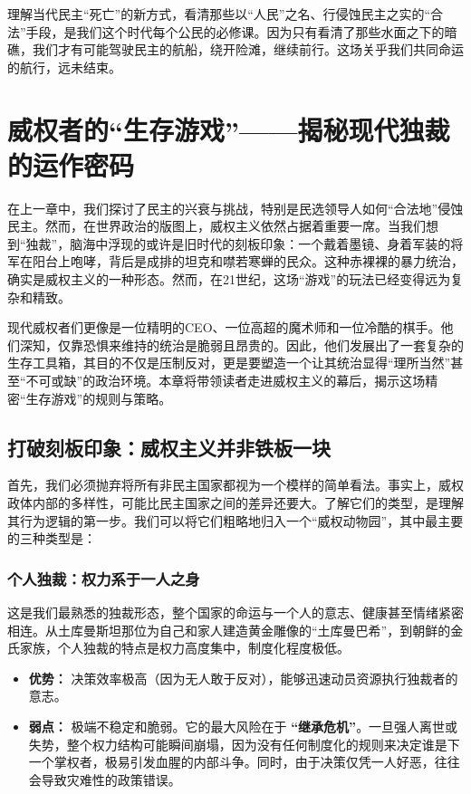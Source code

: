 \documentclass[a5paper, 11pt, openany]{ctexbook}
\begin{document}
理解当代民主“死亡”的新方式，看清那些以“人民”之名、行侵蚀民主之实的“合法”手段，是我们这个时代每个公民的必修课。因为只有看清了那些水面之下的暗礁，我们才有可能驾驶民主的航船，绕开险滩，继续前行。这场关乎我们共同命运的航行，远未结束。

\chapter{威权者的“生存游戏”——揭秘现代独裁的运作密码}

在上一章中，我们探讨了民主的兴衰与挑战，特别是民选领导人如何“合法地”侵蚀民主。然而，在世界政治的版图上，威权主义依然占据着重要一席。当我们想到“独裁”，脑海中浮现的或许是旧时代的刻板印象：一个戴着墨镜、身着军装的将军在阳台上咆哮，背后是成排的坦克和噤若寒蝉的民众。这种赤裸裸的暴力统治，确实是威权主义的一种形态。然而，在21世纪，这场“游戏”的玩法已经变得远为复杂和精致。

现代威权者们更像是一位精明的CEO、一位高超的魔术师和一位冷酷的棋手。他们深知，仅靠恐惧来维持的统治是脆弱且昂贵的。因此，他们发展出了一套复杂的生存工具箱，其目的不仅是压制反对，更是要塑造一个让其统治显得“理所当然”甚至“不可或缺”的政治环境。本章将带领读者走进威权主义的幕后，揭示这场精密“生存游戏”的规则与策略。

\section{打破刻板印象：威权主义并非铁板一块}

首先，我们必须抛弃将所有非民主国家都视为一个模样的简单看法。事实上，威权政体内部的多样性，可能比民主国家之间的差异还要大。了解它们的类型，是理解其行为逻辑的第一步。我们可以将它们粗略地归入一个“威权动物园”，其中最主要的三种类型是：

\subsection{个人独裁：权力系于一人之身}

这是我们最熟悉的独裁形态，整个国家的命运与一个人的意志、健康甚至情绪紧密相连。从土库曼斯坦那位为自己和家人建造黄金雕像的“土库曼巴希”，到朝鲜的金氏家族，个人独裁的特点是权力高度集中，制度化程度极低。
\begin{itemize}
    \item \textbf{优势：} 决策效率极高（因为无人敢于反对），能够迅速动员资源执行独裁者的意志。
    \item \textbf{弱点：} 极端不稳定和脆弱。它的最大风险在于 \textbf{“继承危机”}。一旦强人离世或失势，整个权力结构可能瞬间崩塌，因为没有任何制度化的规则来决定谁是下一个掌权者，极易引发血腥的内部斗争。同时，由于决策仅凭一人好恶，往往会导致灾难性的政策错误。
\end{itemize}
\end{document}
